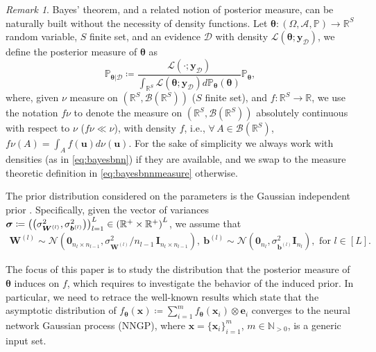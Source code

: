 \documentclass[a4paper, 11pt, reqno]{amsart}
\newcommand{\citep}[2][]{\cite[#1]{#2}}
\theoremstyle{plain}
\theoremstyle{remark}
\newtheorem{remark}[theorem]{Remark}
\theoremstyle{definition}
\newcommand{\normal}[2]{\mathcal{N}\left(#1, #2\right)}
\newcommand{\real}{\mathbb{R}}
\renewcommand{\natural}{\mathbb{N}}
\newcommand{\borel}[1]{\mathcal{B}\left(#1\right)}
\let\oldforall\forall
\renewcommand{\forall}{\oldforall\,}
\newcommand{\train}{\mathcal{D}}
\begin{document}
\begin{remark}
    Bayes' theorem, and a related notion of posterior measure, can be naturally built without the necessity of density functions.
    Let $\bm{\theta}: (\Omega, \mathcal{A}, \mathbb{P}) \to \real^S$ random variable, $S$ finite set, and an evidence $\train$ with density $\mathcal{L}(\bm{\theta}; \bm{y}_{\mathcal{D}})$, we define the posterior measure of $\bm{\theta}$ as
    \begin{equation} \label{eq:bayesbnnmeasure}
        \mathbb{P}_{\bm{\theta} | \train} \coloneqq \frac{\mathcal{L}(\cdot; \bm{y}_{\mathcal{D}})}{\int_{\real^S} \mathcal{L}(\bm{\theta}; \bm{y}_{\mathcal{D}}) d\mathbb{P}_{\bm{\theta}}(\bm{\theta})} \mathbb{P}_{\bm{\theta}},
    \end{equation}
    where, given $\nu$ measure on $(\real^S, \borel{\real^S})$ ($S$ finite set), and $f: \real^S \to \real$, we use the notation $f \nu$ to denote the measure on $(\real^S, \borel{\real^S})$ absolutely continuous with respect to $\nu$ ($f \nu \ll \nu$), with density $f$, i.e., $\forall A \in \borel{\real^S}$, $f \nu (A) = \int_{A} f(\bm{u}) d\nu(\bm{u})$. For the sake of simplicity we always work with densities (as in \cref{eq:bayesbnn}) if they are available, and we swap to the measure theoretic definition in \cref{eq:bayesbnnmeasure} otherwise.
\end{remark}

The prior distribution considered on the parameters is the Gaussian independent prior \citep{neal1996}. Specifically, given the vector of variances $\bm{\sigma} \coloneqq \smash{\big(\big(\sigma_{\bm{W}^{(l)}}^2, \sigma_{\bm{b}^{(l)}}^2\big)\big)_{l = 1}^{L}} \in \left(\real^+ \times \real^+\right)^L$, we assume that
\begin{equation} \label{eq:nealprior}
    \begin{gathered}
        \bm{W}^{(l)} \sim \normal{\bm{0}_{n_l \times n_{l - 1}}}{\sigma_{\bm{W}^{(l)}}^2 / n_{l - 1} \, \bm{I}_{n_l \times n_{l - 1}}}, \ 
        \bm{b}^{(l)} \sim \normal{\bm{0}_{n_l}}{\sigma_{\bm{b}^{(l)}}^2 \bm{I}_{n_l}}, \text{ for } l \in [L].
    \end{gathered}
\end{equation}

The focus of this paper is to study the distribution that the posterior measure of $\bm{\theta}$ induces on $f$, which requires to investigate the behavior of the induced prior. In particular, we need to retrace the well-known results which state that the asymptotic distribution of $f_{\bm{\theta}}(\bm{x}) \coloneqq \sum_{i = 1}^m f_{\bm{\theta}}(\bm{x}_i) \otimes \bm{e}_i$ converges to the neural network Gaussian process (NNGP), where $\bm{x} = \{\bm{x}_i\}_{i = 1}^m$, $m \in \natural_{> 0}$, is a generic input set.
\end{document}
